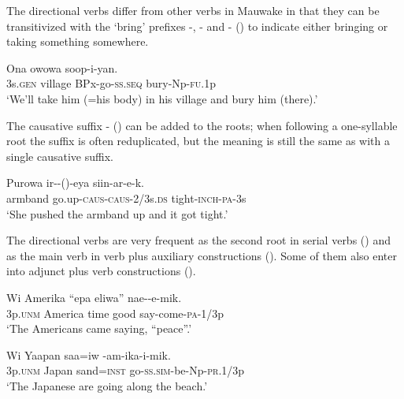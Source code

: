 The directional verbs differ from other verbs in Mauwake in that they can be transitivized with the `bring' prefixes -, - and - () to indicate either bringing or taking something somewhere.

\ea%
\label{ex:3:x286}
\gll Ona owowa  soop-i-yan. \\
3s.\textsc{gen} village BPx-go-\textsc{ss}.\textsc{seq} bury-Np-\textsc{fu}.1p \\
\glt`We'll take him (=his body) in his village and bury him (there).'
\z

The causative suffix \nobreakdash-\textstyleEmphasizedWords{} ()\textstyleEmphasizedWords{} can be added to the roots; when following a one-syllable root the suffix is often reduplicated, but the meaning is still the same as with a single causative suffix.

\ea%
\label{ex:3:x435}
\gll Purowa ir--()-eya siin-ar-e-k. \\
armband go.up-\textsc{caus}-\textsc{caus}-2/3s.\textsc{ds} tight-\textsc{inch}-\textsc{pa}-3s\\
\glt`She pushed the armband up and it got tight.'
\z

The directional verbs are very frequent as the second root in serial verbs  () and as the main verb in verb plus auxiliary constructions  (). Some of them also enter into adjunct plus verb constructions  (). 

\ea%
\label{ex:3:x287}
\gll Wi Amerika ``epa eliwa'' nae--e-mik. \\
3p.\textsc{unm} America time good say-come-\textsc{pa}-1/3p \\
\glt`The Americans came saying, ``peace''.'
\z

\ea%
\label{ex:3:x288}
\gll Wi Yaapan saa=iw -am-ika-i-mik. \\
3p.\textsc{unm} Japan sand=\textsc{inst} go-\textsc{ss}.\textsc{sim}-be-Np-\textsc{pr}.1/3p \\
\glt`The Japanese are going along the beach.'
\z

